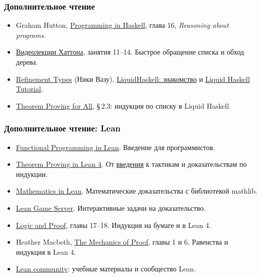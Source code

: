 \documentclass[11pt]{beamer}
\begin{document}
\begin{frame}
  \frametitle{Дополнительное чтение}
  \begin{itemize}
    \item Graham Hutton, \href{https://people.cs.nott.ac.uk/pszgmh/pih.html}{Programming in Haskell}, глава 16, \emph{Reasoning about programs}.
    \item \href{https://people.cs.nott.ac.uk/pszgmh/afp.html}{Видеолекции Хаттона}, занятия 11--14. Быстрое обращение списка и обход дерева.
    \item \href{https://nikivazou.github.io/floc26/Lecture_01_RefinementTypes.html}{Refinement Types} (Ники Вазу), \href{https://ruhaskell.org/posts/utils/2016/12/16/liquidhaskell-hello.html}{LiquidHaskell: знакомство} и \href{https://liquid.kosmikus.org/}{Liquid Haskell Tutorial}.
    \item \href{https://doi.org/10.1145/3242744.3242756}{Theorem Proving for All}, \S\,2.3: индукция по списку в Liquid Haskell.
  \end{itemize}
\end{frame}
\begin{frame}
  \frametitle{Дополнительное чтение: Lean}
  \small
  \begin{itemize}
    \setlength{\itemsep}{1pt}
    \item \href{https://lean-lang.org/functional_programming_in_lean/}{Functional Programming in Lean}. Введение для программистов.
    \item \href{https://lean-lang.org/theorem_proving_in_lean4/}{Theorem Proving in Lean 4}. От \href{https://lean-lang.org/theorem_proving_in_lean4/Introduction/}{введения} к тактикам и доказательствам по индукции.
    \item \href{https://leanprover-community.github.io/mathematics_in_lean/}{Mathematics in Lean}. Математические доказательства с библиотекой mathlib.
    \item \href{https://adam.math.hhu.de/}{Lean Game Server}. Интерактивные задачи на доказательство.
    \item \href{https://leanprover-community.github.io/logic_and_proof/}{Logic and Proof}, главы 17--18. Индукция на бумаге и в Lean 4.
    \item Heather Macbeth, \href{https://hrmacbeth.github.io/math2001/}{The Mechanics of Proof}, главы 1 и 6. Равенства и индукция в Lean 4.
    \item \href{https://leanprover-community.github.io/}{Lean community}: учебные материалы и сообщество Lean.
  \end{itemize}
\end{frame}
\end{document}

